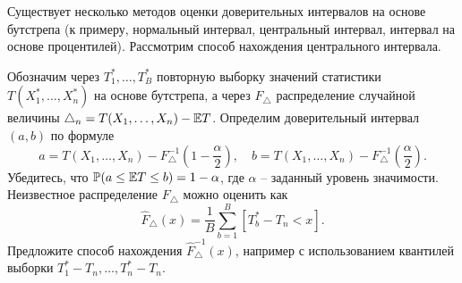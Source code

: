 \begin{problem}
Существует несколько методов оценки доверительных интервалов на основе бутстрепа (к примеру, нормальный интервал, центральный интервал, интервал на основе процентилей). Рассмотрим способ нахождения центрального интервала. 

Обозначим через  $T_1^*,\ldots,T_B^*$ повторную выборку значений статистики $T (X_1^*,\ldots,X_n^*)$ на основе бутстрепа, а через $F_\triangle$ распределение случайной величины $\triangle_n = T(X_1,\ldots,X_n) - \mathrm{{\mathbb E}} T$. Определим доверительный интервал $(a,b)$ по формуле
\[
a = T(X_1,\ldots,X_n) - F_\triangle^{-1} \left(1 - \frac{\alpha}{2} \right),
\quad
b = T(X_1,\ldots,X_n) - F_\triangle^{-1} \left( \frac{\alpha}{2} \right).
\] 
Убедитесь, что $\mathrm{{\mathbb P}}(a \leq  \mathrm{{\mathbb E}} T \leq b) = 1 - \alpha$, где $\alpha$ -- заданный уровень значимости. Неизвестное распределение $F_\triangle$ можно оценить как 
\[
\widehat{F}_\triangle(x) = \frac{1}{B} \sum_{b=1}^B [T_b^* - T_n < x].
\]
Предложите способ нахождения $\widehat{F}_\triangle^{-1}(x)$, например с использованием квантилей выборки $T_1^* - T_n, \ldots, T_n^* - T_n$.
\end{problem}


